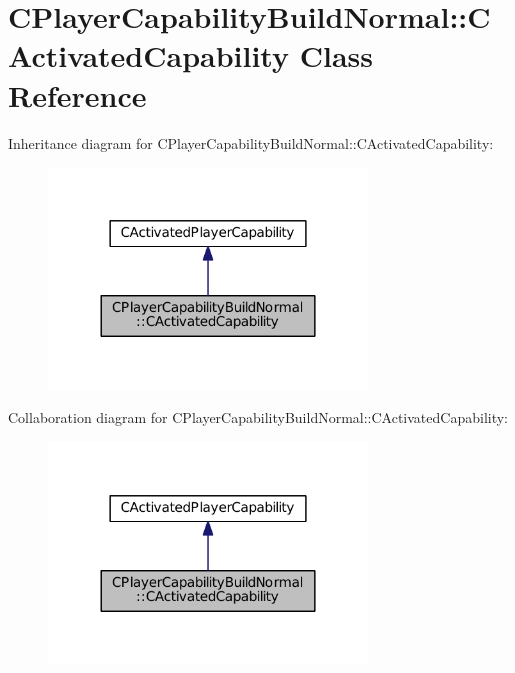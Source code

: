 \hypertarget{classCPlayerCapabilityBuildNormal_1_1CActivatedCapability}{}\section{C\+Player\+Capability\+Build\+Normal\+:\+:C\+Activated\+Capability Class Reference}
\label{classCPlayerCapabilityBuildNormal_1_1CActivatedCapability}


Inheritance diagram for C\+Player\+Capability\+Build\+Normal\+:\+:C\+Activated\+Capability\+:
\nopagebreak
\begin{figure}[H]
\begin{center}
\leavevmode
\includegraphics[width=240pt]{classCPlayerCapabilityBuildNormal_1_1CActivatedCapability__inherit__graph}
\end{center}
\end{figure}


Collaboration diagram for C\+Player\+Capability\+Build\+Normal\+:\+:C\+Activated\+Capability\+:
\nopagebreak
\begin{figure}[H]
\begin{center}
\leavevmode
\includegraphics[width=240pt]{classCPlayerCapabilityBuildNormal_1_1CActivatedCapability__coll__graph}
\end{center}
\end{figure}
